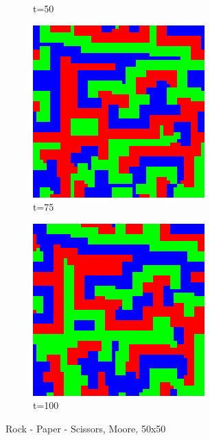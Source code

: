 \documentclass[a4paper, 11pt]{article}
\begin{document}
\begin{landscape}
\begin{figure}[H]
\begin{subfigure}{.20\textwidth}
  \caption{t=50}
\end{subfigure}%
\begin{subfigure}{.20\textwidth}
  \centering
  \includegraphics[width=0.95\linewidth]{ROCK_PAPER_SCISSORS_MOORE_50x50_t75}
  \caption{t=75}
\end{subfigure}%
\begin{subfigure}{.20\textwidth}
  \centering
  \includegraphics[width=0.95\linewidth]{ROCK_PAPER_SCISSORS_MOORE_50x50_t100}
  \caption{t=100}
\end{subfigure}
\caption{Rock - Paper - Scissors, Moore, 50x50}
\end{figure}



\end{landscape}
\end{document}
